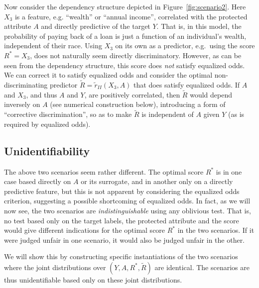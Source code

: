 Now consider the dependency structure depicted in Figure~\ref{fig:scenario2}. 
Here $X_3$ is a feature, e.g. ``wealth'' or
``annual income'', correlated with the protected attribute $A$ and
directly predictive of the target $Y$.  That is, in this model, the
probability of paying back of a loan is just a function of an
individual's wealth, independent of their race.  Using $X_3$ on its
own as a predictor, e.g.~using the score $R^*=X_3$, does not naturally
seem directly discriminatory.  However, as can be seen from the
dependency structure, this score does {\em not} satisfy equalized
odds. We can correct it to satisfy equalized odds and consider the
optimal non-discriminating predictor $\tilde{R}=\tilde{r}_{II}(X_3,A)$
that does satisfy equalized odds.  If $A$ and $X_3$, and thus $A$ and
$Y$, are positively correlated, then $\tilde{R}$ would depend
inversely on $A$ (see numerical construction below), introducing a
form of ``corrective discrimination'', so as to make $\tilde{R}$ is
independent of $A$ given $Y$ (as is required by equalized odds).

\subsection{Unidentifiability}

The above two scenarios seem rather different.  The optimal score
$R^*$ is in one case based directly on $A$ or its surrogate, and in
another only on a directly predictive feature, but this is not
apparent by considering the equalized odds criterion, suggesting a
possible shortcoming of equalized odds. In fact, as we will now
see, the two scenarios are {\em indistinguishable} using any oblivious
test. That is, no test based only on the target labels, the protected
attribute and the score would give different indications for the
optimal score $R^*$ in the two scenarios. If it were judged unfair in one
scenario, it would also be judged unfair in the other.

We will show this by constructing specific instantiations of the two
scenarios where the joint distributions over $(Y,A,R^*,\tilde{R})$ are
identical. The scenarios are thus unidentifiable based only on these
joint distributions.

